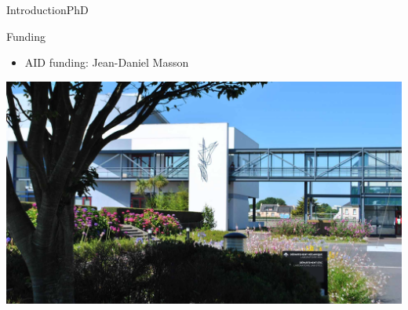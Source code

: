 \documentclass[10pt, xcolor={usenames, dvipsnames}]{beamer}
\begin{document}
\begin{frame}{Introduction}{PhD}
\begin{minipage}[c]{0.58\textwidth}
                \begin{block}{Funding}
                    \begin{itemize}
                        \item AID funding: Jean-Daniel Masson
                    \end{itemize}
                \end{block}
            \end{minipage}
            \hfill
            \begin{minipage}[c]{0.4\textwidth}
                \includegraphics[height=0.7\textheight, trim={24cm 0 16cm 0}, clip]{imgs/ensta.jpg}
            \end{minipage}
        \end{frame}
\end{document}
